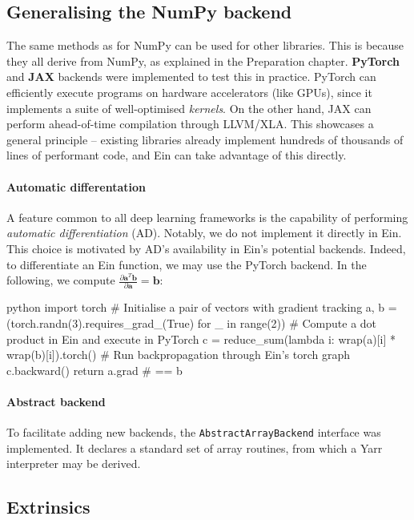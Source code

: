 \subsection{Generalising the NumPy backend}

The same methods as for NumPy can be used for other libraries. This is because they all derive from NumPy, as explained in the Preparation chapter. \textbf{PyTorch} and \textbf{JAX} backends were implemented to test this in practice. PyTorch can efficiently execute programs on hardware accelerators (like GPUs), since it implements a suite of well-optimised \textit{kernels}. On the other hand, JAX can perform ahead-of-time compilation through LLVM/XLA. This showcases a general principle -- existing libraries already implement hundreds of thousands of lines of performant code, and Ein can take advantage of this directly.

\paragraph{Automatic differentation} A feature common to all deep learning frameworks is the capability of performing \textit{automatic differentiation} (AD). Notably, we do not implement it directly in Ein. This choice is motivated by AD's availability in Ein's potential backends. Indeed, to differentiate an Ein function, we may use the PyTorch backend. In the following, we compute $\frac{\partial \mathbf{a}^T \mathbf{b}}{\partial \mathbf{a}} = \mathbf{b}$:
\begin{center}
\begin{cminted}{python}
import torch
# Initialise a pair of vectors with gradient tracking
a, b = (torch.randn(3).requires_grad_(True) for _ in range(2))
# Compute a dot product in Ein and execute in PyTorch
c = reduce_sum(lambda i: wrap(a)[i] * wrap(b)[i]).torch()
# Run backpropagation through Ein's torch graph
c.backward()
return a.grad  # == b
\end{cminted}
\end{center}

\paragraph{Abstract backend} To facilitate adding new backends, the \texttt{AbstractArrayBackend} interface was implemented. It declares a standard set of array routines, from which a Yarr interpreter may be derived.

\subsection{Extrinsics}

